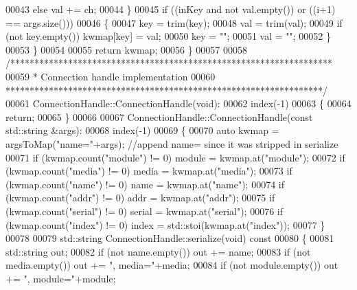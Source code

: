 \begin{DoxyCode}
00043             \textcolor{keywordflow}{else} val += ch;
00044         \}
00045         \textcolor{keywordflow}{if} ((inKey and not val.empty()) or ((i+1) == args.size()))
00046         \{
00047             key = trim(key);
00048             val = trim(val);
00049             \textcolor{keywordflow}{if} (not key.empty()) kwmap[key] = val;
00050             key = \textcolor{stringliteral}{""};
00051             val = \textcolor{stringliteral}{""};
00052         \}
00053     \}
00054 
00055     \textcolor{keywordflow}{return} kwmap;
00056 \}
00057 
00058 \textcolor{comment}{/*******************************************************************}
00059 \textcolor{comment}{ * Connection handle implementation}
00060 \textcolor{comment}{ ******************************************************************/}
00061 ConnectionHandle::ConnectionHandle(\textcolor{keywordtype}{void}):
00062     index(-1)
00063 \{
00064     \textcolor{keywordflow}{return};
00065 \}
00066 
00067 ConnectionHandle::ConnectionHandle(\textcolor{keyword}{const} std::string &args):
00068     index(-1)
00069 \{
00070     \textcolor{keyword}{auto} kwmap = argsToMap(\textcolor{stringliteral}{"name="}+args); \textcolor{comment}{//append name= since it was stripped in serialize}
00071     \textcolor{keywordflow}{if} (kwmap.count(\textcolor{stringliteral}{"module"}) != 0) module = kwmap.at(\textcolor{stringliteral}{"module"});
00072     \textcolor{keywordflow}{if} (kwmap.count(\textcolor{stringliteral}{"media"}) != 0) media = kwmap.at(\textcolor{stringliteral}{"media"});
00073     \textcolor{keywordflow}{if} (kwmap.count(\textcolor{stringliteral}{"name"}) != 0) name = kwmap.at(\textcolor{stringliteral}{"name"});
00074     \textcolor{keywordflow}{if} (kwmap.count(\textcolor{stringliteral}{"addr"}) != 0) addr = kwmap.at(\textcolor{stringliteral}{"addr"});
00075     \textcolor{keywordflow}{if} (kwmap.count(\textcolor{stringliteral}{"serial"}) != 0) serial = kwmap.at(\textcolor{stringliteral}{"serial"});
00076     \textcolor{keywordflow}{if} (kwmap.count(\textcolor{stringliteral}{"index"}) != 0) index = std::stoi(kwmap.at(\textcolor{stringliteral}{"index"}));
00077 \}
00078 
00079 std::string ConnectionHandle::serialize(\textcolor{keywordtype}{void})\textcolor{keyword}{ const}
00080 \textcolor{keyword}{}\{
00081     std::string out;
00082     \textcolor{keywordflow}{if} (not name.empty()) out += name;
00083     \textcolor{keywordflow}{if} (not media.empty()) out += \textcolor{stringliteral}{", media="}+media;
00084     \textcolor{keywordflow}{if} (not module.empty()) out += \textcolor{stringliteral}{", module="}+module;

\end{DoxyCode}
